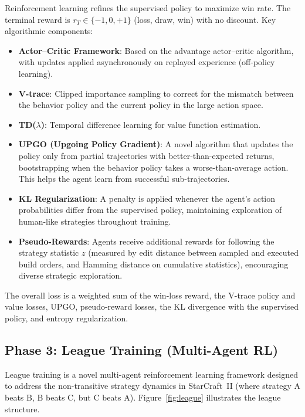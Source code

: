 \documentclass[11pt,a4paper]{article}
\begin{document}
Reinforcement learning refines the supervised policy to maximize win rate. The terminal reward is $r_T \in \{-1, 0, +1\}$ (loss, draw, win) with no discount. Key algorithmic components:

\begin{itemize}[nosep]
    \item \textbf{Actor--Critic Framework}: Based on the advantage actor--critic algorithm, with updates applied asynchronously on replayed experience (off-policy learning).
    \item \textbf{V-trace}: Clipped importance sampling to correct for the mismatch between the behavior policy and the current policy in the large action space.
    \item \textbf{TD($\lambda$)}: Temporal difference learning for value function estimation.
    \item \textbf{UPGO (Upgoing Policy Gradient)}: A novel algorithm that updates the policy only from partial trajectories with better-than-expected returns, bootstrapping when the behavior policy takes a worse-than-average action. This helps the agent learn from successful sub-trajectories.
    \item \textbf{KL Regularization}: A penalty is applied whenever the agent's action probabilities differ from the supervised policy, maintaining exploration of human-like strategies throughout training.
    \item \textbf{Pseudo-Rewards}: Agents receive additional rewards for following the strategy statistic $z$ (measured by edit distance between sampled and executed build orders, and Hamming distance on cumulative statistics), encouraging diverse strategic exploration.
\end{itemize}

The overall loss is a weighted sum of the win-loss reward, the V-trace policy and value losses, UPGO, pseudo-reward losses, the KL divergence with the supervised policy, and entropy regularization.

\subsection{Phase 3: League Training (Multi-Agent RL)}

League training is a novel multi-agent reinforcement learning framework designed to address the non-transitive strategy dynamics in StarCraft~II (where strategy A beats B, B beats C, but C beats A). Figure~\ref{fig:league} illustrates the league structure.
\end{document}
